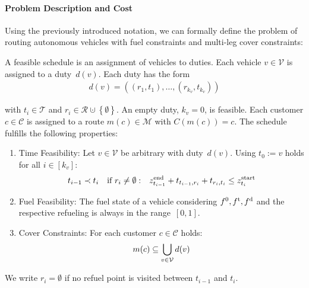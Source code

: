 \paragraph{Problem Description and Cost} \parfill

Using the previously introduced notation, we can formally define the problem of routing autonomous vehicles with fuel constraints and multi-leg cover constraints:

\begin{definition}
\label{def:feasible_schedule}

A feasible schedule is an assignment of vehicles to duties. Each vehicle ${v\in\mathcal{V}}$ is assigned to a duty~$d(v)$. Each duty has the form 
\begin{align*}
	d(v) = \left(\left(r_1,t_1\right),\dots,\left(r_{k_v},t_{k_v}\right)\right)
\end{align*}

with ${t_i\in\mathcal{T}}$ and ${r_i\in\mathcal{R}\cupdot\left\{\emptyset\right\}}$. An empty duty, \ie ${k_v=0}$, is feasible. Each customer ${c\in\mathcal{C}}$ is assigned to a route ${m(c)\in\mathcal{M}}$ with ${C\left(m(c)\right) = c}$. The schedule fulfills the following properties:
\begin{enumerate}
	\item{Time Feasibility:}
Let ${v\in\mathcal{V}}$ be arbitrary with duty~$d(v)$. Using ${t_0 := v}$ holds for all ${i\in[k_v]}$:
\begin{align*}
	t_{i-1}\prec t_i && \text{if } r_i\neq\emptyset : && z^{\operatorname{end}}_{t_{i-1}} + t_{t_{i-1},r_i} + t_{r_i,t_i} \leq z^{\operatorname{start}}_{t_i} 
\end{align*}
	
	\item{Fuel Feasibility:}
The fuel state of a vehicle considering $f^0, f^{\operatorname{t}}, f^{\operatorname{d}}$ and the respective refueling is always in the range~$[0,1]$.

	\item{Cover Constraints:}
For each customer ${c\in\mathcal{C}}$ holds:
\begin{align*}
	m(c) \subseteq \bigcup_{v\in\mathcal{V}} d(v)
\end{align*}

\end{enumerate}

\end{definition}

We write ${r_i = \emptyset}$ if no refuel point is visited between $t_{i-1}$ and $t_i$.

